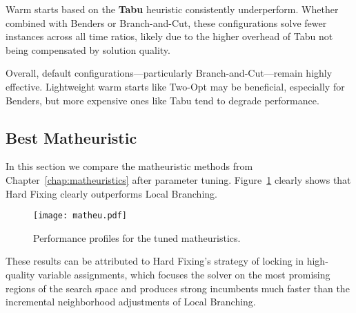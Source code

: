 Warm starts based on the \textbf{Tabu} heuristic consistently underperform. Whether combined with Benders or Branch-and-Cut, these configurations solve fewer instances across all time ratios, likely due to the higher overhead of Tabu not being compensated by solution quality.

Overall, default configurations—particularly Branch-and-Cut—remain highly effective. Lightweight warm starts like Two-Opt may be beneficial, especially for Benders, but more expensive ones like Tabu tend to degrade performance.

\subsection{Best Matheuristic}
\label{ssec:best-matheu}

In this section we compare the matheuristic methods from Chapter~\ref{chap:matheuristics} after parameter tuning. Figure~\ref{fig:matheu} clearly shows that Hard Fixing clearly outperforms Local Branching.

\begin{figure}[H]
  \centering
  \texttt{[image: matheu.pdf]}
  \caption{Performance profiles for the tuned matheuristics.}
  \label{fig:matheu}
\end{figure}

These results can be attributed to Hard Fixing's strategy of locking in high-quality variable assignments, which focuses the solver on the most promising regions of the search space and produces strong incumbents much faster than the incremental neighborhood adjustments of Local Branching.  
